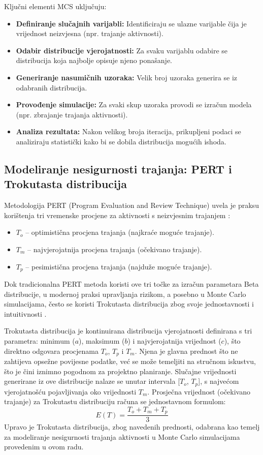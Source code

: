 Ključni elementi MCS uključuju:
\begin{itemize}
    \item \textbf{Definiranje slučajnih varijabli:} Identificiraju se ulazne varijable čija je vrijednost neizvjesna (npr. trajanje aktivnosti).
    \item \textbf{Odabir distribucije vjerojatnosti:} Za svaku varijablu odabire se distribucija koja najbolje opisuje njeno ponašanje.
    \item \textbf{Generiranje nasumičnih uzoraka:} Velik broj uzoraka generira se iz odabranih distribucija.
    \item \textbf{Provođenje simulacije:} Za svaki skup uzoraka provodi se izračun modela (npr. zbrajanje trajanja aktivnosti).
    \item \textbf{Analiza rezultata:} Nakon velikog broja iteracija, prikupljeni podaci se analiziraju statistički kako bi se dobila distribucija mogućih ishoda.
\end{itemize}

\subsection{Modeliranje nesigurnosti trajanja: PERT i Trokutasta distribucija}
Metodologija PERT (Program Evaluation and Review Technique) uvela je praksu korištenja tri vremenske procjene za aktivnosti s neizvjesnim trajanjem \cite{Malcolm1959}:
\begin{itemize}
    \item \textbf{$T_o$} – optimistična procjena trajanja (najkraće moguće trajanje).
    \item \textbf{$T_m$} – najvjerojatnija procjena trajanja (očekivano trajanje).
    \item \textbf{$T_p$} – pesimistična procjena trajanja (najduže moguće trajanje).
\end{itemize}
Dok tradicionalna PERT metoda koristi ove tri točke za izračun parametara Beta distribucije, u modernoj praksi upravljanja rizikom, a posebno u Monte Carlo simulacijama, često se koristi Trokutasta distribucija zbog svoje jednostavnosti i intuitivnosti \cite{Law2015}.

Trokutasta distribucija je kontinuirana distribucija vjerojatnosti definirana s tri parametra: minimum ($a$), maksimum ($b$) i najvjerojatnija vrijednost ($c$), što direktno odgovara procjenama $T_o$, $T_p$ i $T_m$. Njena je glavna prednost što ne zahtijeva opsežne povijesne podatke, već se može temeljiti na stručnom iskustvu, što je čini iznimno pogodnom za projektno planiranje. Slučajne vrijednosti generirane iz ove distribucije nalaze se unutar intervala [$T_o$, $T_p$], s najvećom vjerojatnošću pojavljivanja oko vrijednosti $T_m$. Prosječna vrijednost (očekivano trajanje) za Trokutastu distribuciju računa se jednostavnom formulom:
$$
E(T) = \frac{T_o + T_m + T_p}{3}
$$
Upravo je Trokutasta distribucija, zbog navedenih prednosti, odabrana kao temelj za modeliranje nesigurnosti trajanja aktivnosti u Monte Carlo simulacijama provedenim u ovom radu.
